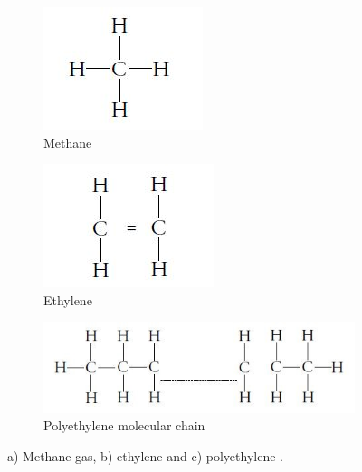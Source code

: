 \documentclass[12pt]{report}
\begin{document}
\begin{figure}[H]
\centering

\begin{subfigure}{.3\textwidth}
    \centering
    \includegraphics[width=\textwidth]{methane_molecular_chain.jpg}
    \caption{Methane}
\end{subfigure}
\begin{subfigure}{.3\textwidth}
    \centering
    \includegraphics[width=\textwidth]{ethylene_molecular_chain.jpg}
    \caption{Ethylene}
\end{subfigure}
\begin{subfigure}{.65\textwidth}
    \centering
    \includegraphics[width=\textwidth]{polythylene_molecular_chain.jpg}
    \caption{Polyethylene molecular chain}
\end{subfigure}

\caption{a) Methane gas, b) ethylene and c) polyethylene \cite{gabriel1998history}.}
\label{ch3:figure:molecular_chains}
\end{figure}
\end{document}
